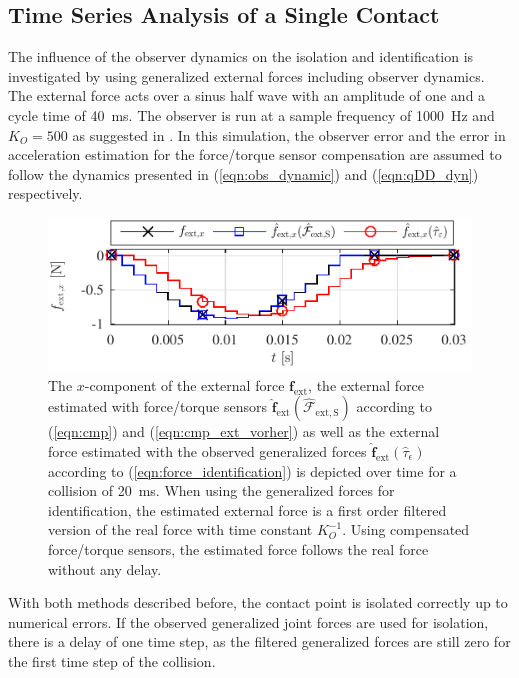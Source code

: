 \subsection{Time Series Analysis of a Single Contact}
The influence of the observer dynamics on the isolation and identification is investigated by using generalized external forces including observer dynamics.
The external force acts over a sinus half wave with an amplitude of one and a cycle time of 40~ms.
The observer is run at a sample frequency of 1000~Hz and $K_O=500$ as suggested in \cite{Haddadin2014}.
In this simulation, the observer error and the error in acceleration estimation for the force/torque sensor compensation are assumed to follow the dynamics presented in (\ref{eqn:obs_dynamic}) and (\ref{eqn:qDD_dyn}) respectively.
%
\begin{figure}
\begin{center}
\includegraphics{figures/colltest_single_filter/colltest_single_filter_f}
\end{center}\vspace*{-0.4cm}
\caption{The $x$-component of the external force $\bm{f}_\mathrm{ext}$, the external force estimated with force/torque sensors  $\hat{\bm{f}}_{\mathrm{ext}}(\hat{\bm{\mathcal{F}}}_{\mathrm{ext,S}})$ according to (\ref{eqn:cmp}) and (\ref{eqn:cmp_ext_vorher}) as well as the external force estimated with the observed generalized forces $\hat{\bm{f}}_{\mathrm{ext}}(\hat{\tau}_\epsilon)$ according to (\ref{eqn:force_identification}) is depicted over time for a collision of  20~ms.
When using the generalized forces for identification, the estimated external force is a first order filtered version of the real force with time constant $K_O^{-1}$.
Using compensated force/torque sensors, the estimated force follows the real force without any delay.}\vspace*{-0.6cm}
\label{fig:coll_singlecontact_filter}
\end{figure}
%
With both methods described before, the contact point is isolated correctly up to numerical errors.
If the observed generalized joint forces are used for isolation, there is a delay of one time step, as the filtered generalized forces are still zero for the first time step of the collision.

